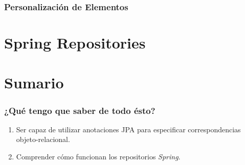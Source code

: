 \documentclass[a4paper,slidestop,xcolor=pst,blue]{beamer}
\begin{document}
\begin{frame}[c]
    \frametitle{Personalización de Elementos}
    \begin{description}
        \item[@Table]
        \item[@Column]
        \item[@JoinColumn]
        \item
    \end{description}
\end{frame}


\section{Spring Repositories}

\section{Sumario}

\begin{frame}[c]
    \frametitle{¿Qué tengo que saber de todo ésto?}
    \begin{enumerate}[<+->]
        \item Ser capaz de utilizar anotaciones JPA para especificar correspondencias objeto-relacional.
        \item Comprender cómo funcionan los repositorios \emph{Spring}.
    \end{enumerate}
\end{frame}
\end{document}
